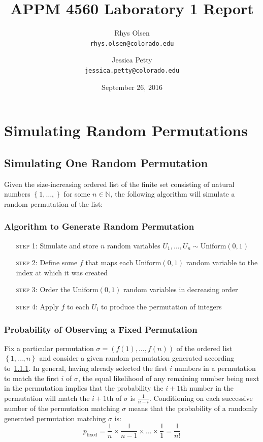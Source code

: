 \documentclass[11pt, oneside]{article}   	%
\title{APPM 4560 Laboratory 1 Report}
\author{Rhys Olsen\\
\texttt{rhys.olsen@colorado.edu}
 \and Jessica Petty\\
 \texttt{jessica.petty@colorado.edu}
 }
\date{September 26, 2016}
\begin{document}
\maketitle
\section{Simulating Random Permutations}
\subsection{Simulating One Random Permutation}

Given the size-increasing ordered list of the finite set consisting of natural numbers $\left\{1, \dots, \right\}$ for some $n \in \mathbb{N}$, the following algorithm will simulate a random permutation of the list:


\subsubsection{Algorithm to Generate Random Permutation}\label{sssec:perm}
\begin{enumerate}[leftmargin=30pt,labelindent=65pt,itemindent=30pt]
\item[\textsc{step 1:}] Simulate and store $n$ random variables $U_1, \dots, U_n \sim \text{Uniform}(0,1)$

\item[\textsc{step 2:}] Define some $f$ that maps each $\text{Uniform}\left(0,1 \right)$ random variable to the index at which it was created

\item[\textsc{step 3:}] Order the $\text{Uniform}\left(0,1 \right)$ random variables in decreasing order

\item[\textsc{step 4:}] Apply $f$ to each $U_i$ to produce the permutation of integers
\end{enumerate}

\subsubsection{Probability of Observing a Fixed Permutation}
Fix a particular permutation $\sigma = (f(1), \dots, f(n))$ of the ordered list $\left\{1, \dots, n\right\}$ and consider a given random permutation generated according to~\ref{sssec:perm}. In general, having already selected the first $i$ numbers in a permutation to match the first $i$ of $\sigma$, the equal likelihood of any remaining number being next in the permutation implies that the probability the $i + 1$th number in the permutation will match the $i + 1$th of $\sigma$ is $\frac{1}{n - i}$. Conditioning on each successive number of the permutation matching $\sigma$ means that the probability of a randomly generated permutation matching $\sigma$ is:
\begin{equation}\label{eqn:fix}
  p_{\text{fixed}} = \frac{1}{n} \times \frac{1}{n - 1} \times \dots \times \frac{1}{1} = \frac{1}{n!}
\end{equation}
\end{document}
